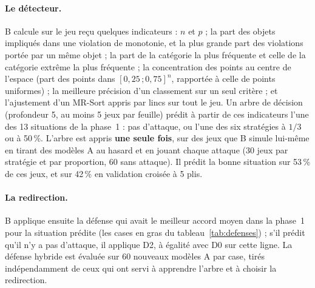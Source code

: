 \documentclass[11pt,a4paper]{article}
\begin{document}
\paragraph{Le détecteur.} B calcule sur le jeu reçu quelques indicateurs : $n$ et $p$ ; la part des objets
impliqués dans une violation de monotonie, et la plus grande part des violations portée par un même objet ; la
part de la catégorie la plus fréquente et celle de la catégorie extrême la plus fréquente ; la concentration des
points au centre de l'espace (part des points dans $[0{,}25\,;0{,}75]^n$, rapportée à celle de points
uniformes) ; la meilleure précision d'un classement sur un seul critère ; et l'ajustement d'un MR-Sort appris par
lincs sur tout le jeu. Un arbre de décision (profondeur 5, au moins 5 jeux par feuille) prédit à partir de ces
indicateurs l'une des 13 situations de la phase~1 : pas d'attaque, ou l'une des six stratégies à $1/3$ ou à
50\,\%. L'arbre est appris \textbf{une seule fois}, sur des jeux que B simule lui-même en tirant des modèles A au
hasard et en jouant chaque attaque (30 jeux par stratégie et par proportion, 60 sans attaque). Il prédit la
bonne situation sur 53\,\% de ces jeux, et sur 42\,\% en validation croisée à 5 plis.

\paragraph{La redirection.} B applique ensuite la défense qui avait le meilleur accord moyen dans la phase~1 pour
la situation prédite (les cases en gras du tableau~\ref{tab:defenses}) ; s'il prédit qu'il n'y a pas d'attaque, il
applique D2, à égalité avec D0 sur cette ligne. La défense hybride est évaluée sur 60 nouveaux modèles A par case,
tirés indépendamment de ceux qui ont servi à apprendre l'arbre et à choisir la redirection.
\end{document}
